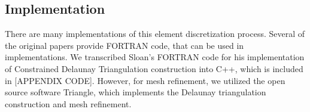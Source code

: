 \documentclass[../fem.tex]{subfiles}
\begin{document}
\subsection{Implementation}%
\label{sub:implementation}

There are many implementations of this element discretization process. Several
of the original papers provide FORTRAN code, that can be used in
implementations. We transcribed Sloan's FORTRAN code for his implementation of
Constrained Delaunay Triangulation construction into C++, which is included in
[APPENDIX CODE]. However, for mesh refinement, we utilized the open source
software Triangle\cite{T_SOF}, which implements the Delaunay triangulation
construction and mesh refinement.

\end{document}
